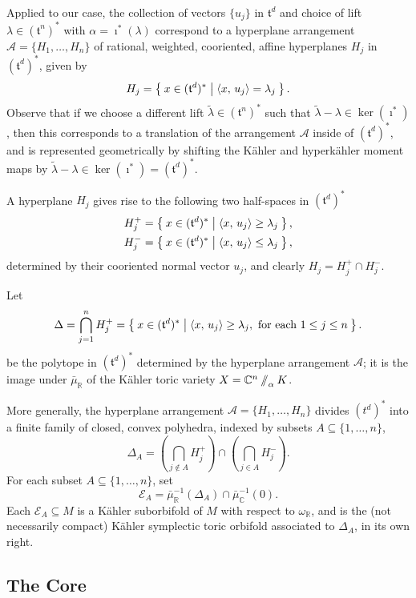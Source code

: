 \documentclass{article}
\newcommand{\w}{\omega}
\newcommand{\RR}{\mathbb{R}}
\newcommand{\CC}{\mathbb{C}}
\newcommand{\mcA}{\mathcal{A}}
\newcommand{\mcE}{\mathcal{E}}
\newcommand{\mft}{\mathfrak{t}}
\newcommand{\sslash}{\mathbin{/\mkern-6mu/}}
\begin{document}
	Applied to our case, the collection of vectors $\{u_{j}\}$ in $\mft^{d}$ and choice of lift $\lambda \in (\mft^{n})^{\ast}$ with $\alpha = \imath^{\ast}(\lambda)$ correspond to a hyperplane arrangement $\mcA = \{H_{1}, \ldots, H_{n}\}$ of rational, weighted, cooriented, affine hyperplanes $H_{j}$ in $(\mft^{d})^{\ast}$, given by
	\[
		H_{j} = \Set{ x \in (\mft^{d})^{\ast} | \langle x,\, u_{j} \rangle = \lambda_{j}}.
	\]
	Observe that if we choose a different lift $\tilde{\lambda} \in (\mft^{n})^{\ast}$ such that $\tilde{\lambda} -\lambda \in \ker(\imath^{\ast})$, then this corresponds to a translation of the arrangement $\mcA$ inside of $(\mft^{d})^{\ast}$, and is represented geometrically by shifting the K\"ahler and hyperk\"ahler moment maps by $\tilde{\lambda} - \lambda \in \ker(\imath^{\ast}) = (\mft^{d})^{\ast}$. 
	
	A hyperplane $H_{j}$ gives rise to the following two half-spaces in $(\mft^{d})^{\ast}$
	\begin{align*}
		H_{j}^{+} &= \Set{ x \in (\mft^{d})^{\ast} | \langle x,\, u_{j} \rangle \geq \lambda_{j} }, \\
		H_{j}^{-} &= \Set{ x \in (\mft^{d})^{\ast} | \langle x,\, u_{j} \rangle \leq \lambda_{j} },
	\end{align*}
	determined by their cooriented normal vector $u_{j}$, and clearly $H_{j} = H_{j}^{+} \cap H_{j}^{-}$.
	
	Let
	\[
		\Delta = \bigcap_{j=1}^{n} H_{j}^{+} = \Set{x \in (\mft^{d})^{\ast} | \langle x,\, u_{j} \rangle \geq \lambda_{j}, \text{ for each } 1 \leq j \leq n }.
	\]
	be the polytope in $(\mft^{d})^{\ast}$ determined by the hyperplane arrangement $\mcA$; it is the image under $\bar{\mu}_{\RR}$ of the K\"ahler toric variety $X = \CC^{n}\sslash_{\alpha} K$.
	
	More generally, the hyperplane arrangement $\mcA = \{H_{1}, \ldots, H_{n} \}$ divides $(t^{d})^{\ast}$ into a finite family of closed, convex polyhedra, indexed by subsets $A \subseteq \{1,\ldots, n\}$,
	\[
		\Delta_{A} = \left(\bigcap_{j \not\in A} H_{j}^{+} \right) \cap \left(\bigcap_{j \in A} H_{j}^{-} \right).
	\]
	For each subset $A \subseteq \{1, \ldots, n\}$, set
	\[
			\mcE_{A} = \bar{\mu}_{\RR}^{-1}(\Delta_{A})\cap \bar{\mu}_{\CC}^{-1}(0).
	\]
	Each $\mcE_{A} \subseteq M$ is a K\"ahler suborbifold of $M$ with respect to $\w_{\RR}$, and is the (not necessarily compact) K\"ahler symplectic toric orbifold associated to $\Delta_{A}$, in its own right.
		
	\subsection{The Core}
	
\end{document}
